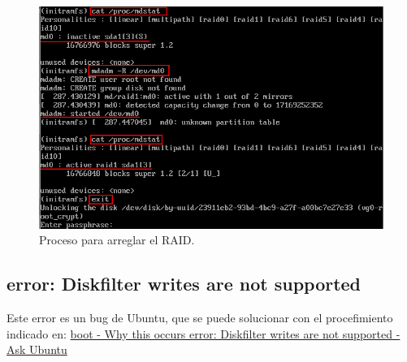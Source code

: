 \begin{figure}[H]
    \begin{center}
        \includegraphics[scale=0.5]{Imagenes/activar}
        \caption{Proceso para arreglar el RAID.}
        \label{fig11}
    \end{center}
\end{figure}


\label{praid}
\subsection{error:  Diskfilter writes are not supported}
Este error es un bug de Ubuntu, que se puede solucionar con el procefimiento indicado en: \href{http://askubuntu.com/questions/468466/why-this-occurs-error-diskfilter-writes-are-not-supported/468487#468487}{boot - Why this occurs error: Diskfilter writes are not supported - Ask Ubuntu}
